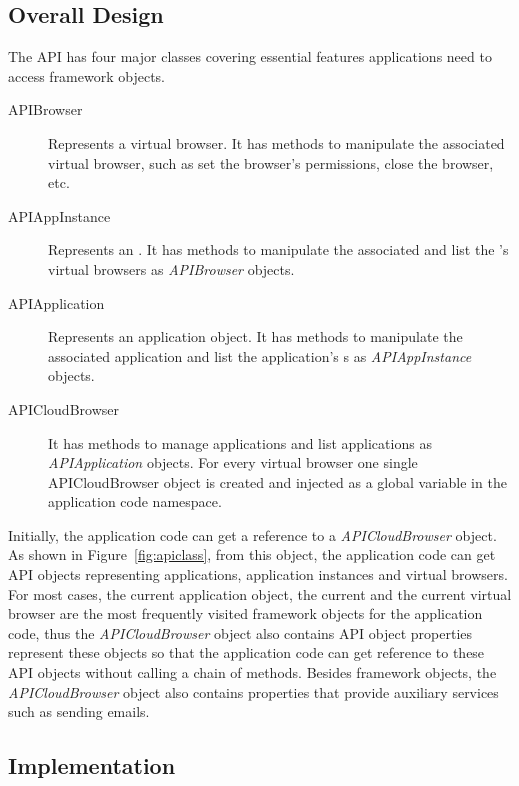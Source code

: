 \subsection{Overall Design}

The \cb API has four major classes covering essential features applications
need to access framework objects.

\begin{description}

\item[APIBrowser] Represents a virtual browser.
It has methods to manipulate the associated virtual browser, such as
set the browser's permissions, close the browser, etc.

\item[APIAppInstance] Represents an \appins{}. It has methods to manipulate
the associated \appins{} and list the \appins{}'s virtual browsers as 
\emph{APIBrowser} objects.


\item[APIApplication] Represents an application object.
It has methods to manipulate the associated application
and list the application's \appins{}s as \emph{APIAppInstance} objects.


\item[APICloudBrowser]
It has methods to manage applications and list applications as \emph{APIApplication} objects.
For every virtual browser one single APICloudBrowser object is created and injected as
a global variable in the application code namespace.

\end{description}

\apiclassfig{}


Initially, the application code can get a reference to a
\emph{APICloudBrowser} object. As shown in Figure~\ref{fig:apiclass}, from
this object, the application code can get API objects representing
applications, application instances and virtual browsers. 
For most cases, the
current application object, the current \appins{} and the current virtual browser are
the most frequently visited framework objects for the application code, thus
the \emph{APICloudBrowser} object also contains API object properties
represent these objects so that  the application code can get reference to
these API objects without calling a chain of methods. Besides framework
objects, the \emph{APICloudBrowser} object also contains properties that
provide auxiliary services such as sending emails.


\subsection{Implementation}

